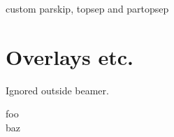 \documentclass[a4paper]{article}
\begin{document}
\begin{pseudo}[parskip=1cm, topsep=1cm, partopsep=1cm]
custom parskip, topsep and partopsep
\end{pseudo}

\section*{Overlays etc.}

Ignored outside \textsf{beamer}.

\begin{pseudo}[pause, kwfont<3>=\nf, unknown<3>=42]
    foo \\<2>
    baz
\end{pseudo}

\end{document}
